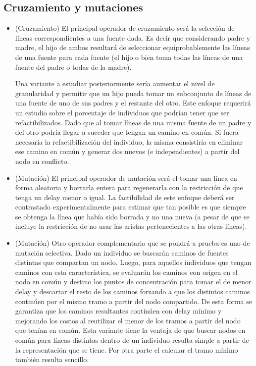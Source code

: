 \documentclass{extarticle}
\begin{document}
\subsection{Cruzamiento y mutaciones}
\begin{itemize}
	\item (Cruzamiento) El principal operador de cruzamiento será la selección de líneas correspondientes a una fuente dada. Es decir que considerando padre y madre, el hijo de ambos resultará de seleccionar equiprobablemente las líneas de una fuente para cada fuente (el hijo o bien toma todas las líneas de una fuente del padre o todas de la madre).
	
	Una variante a estudiar posteriormente sería aumentar el nivel de granularidad y permitir que un hijo pueda tomar un subconjunto de líneas de una fuente de uno de sus padres y el restante del otro. Este enfoque requerirá un estudio sobre el porcentaje de individuos que podrían tener que ser refactibilizados. Dado que al tomar líneas de una misma fuente de un padre y del otro podría llegar a suceder que tengan un camino en común. Si fuera necesaria la refactibilización del individuo, la misma consistiría en eliminar ese camino en común y generar dos nuevos (e independientes) a partir del nodo en conflicto.
	
	\item (Mutación) El principal operador de mutación será el tomar una línea  en forma aleatoria y borrarla entera para regenerarla con la restricción de que tenga un delay menor o igual. La factibilidad de este enfoque deberá ser contrastado experimentalmente para estimar que tan posible es que siempre se obtenga la línea que había sido borrada y no una nueva (a pesar de que se incluye la restricción de no usar las aristas pertenecientes a las otras líneas).
	\newpage
	\item (Mutación) Otro operador complementario que se pondrá a prueba es uno de mutación selectiva.
	Dado un individuo se buscarán caminos de fuentes distintas que compartan un nodo. Luego, para aquellos individuos que tengan caminos con esta característica, se evaluarán los caminos con origen en el nodo en común y destino los puntos de concentración para tomar el de menor delay y descartar el resto de los caminos forzando a que los distintos caminos continúen por el mismo tramo a partir del nodo compartido. De esta forma se garantiza que los caminos resultantes continúen con delay mínimo y mejorando los costos al reutilizar el menor de los tramos a partir del nodo que tenían en común. 
	Esta variante tiene la ventaja de que buscar nodos en común para líneas distintas dentro de un individuo resulta simple a partir de la representación que se tiene. Por otra parte el calcular el tramo mínimo también resulta sencillo.
\end{itemize}
\end{document}
